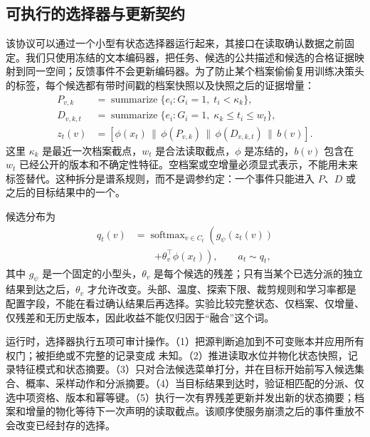 \documentclass[UTF8,twocolumn]{ctexart}
\newcommand{\unknown}{\textsc{未知}}
\begin{document}
\subsection{可执行的选择器与更新契约}
该协议可以通过一个小型有状态选择器运行起来，其接口在读取确认数据之前固定。我们只使用冻结的文本编码器，把任务、候选的公共描述和候选的合格证据映射到同一空间；反馈事件不会更新编码器。为了防止某个档案偷偷复用训练决策头的标签，每个候选都有带时间戳的档案快照以及快照之后的证据增量：
\begin{align}
 P_{v,k}&=\operatorname{summarize}\{e_i:G_i=1,\;t_i<\kappa_k\},\\
 D_{v,k,t}&=\operatorname{summarize}\{e_i:G_i=1,\;\kappa_k\leq t_i\leq w_t\},\\
 z_t(v)&=[\phi(x_t)\,\|\,\phi(P_{v,k})\,\|\,\phi(D_{v,k,t})\,\|\,b(v)] .
 \label{eq:selector-state}
\end{align}
这里 $\kappa_k$ 是最近一次档案截点，$w_t$ 是合法读取截点，$\phi$ 是冻结的，$b(v)$ 包含在 $w_t$ 已经公开的版本和不确定性特征。空档案或空增量必须显式表示，不能用未来标签替代。这种拆分是谱系规则，而不是调参约定：一个事件只能进入 $P$、$D$ 或之后的目标结果中的一个。

候选分布为
\begin{equation}
 \begin{aligned}
 q_t(v)&=\operatorname{softmax}_{v\in C_t}\left(g_\psi(z_t(v))\right.\\
       &\qquad\left.+\theta_v^\top\phi(x_t)\right),
       \qquad a_t\sim q_t,
 \end{aligned}
 \label{eq:selector}
\end{equation}
其中 $g_\psi$ 是一个固定的小型头，$\theta_v$ 是每个候选的残差；只有当某个已选分派的独立结果到达之后，$\theta_v$ 才允许改变。头部、温度、探索下限、裁剪规则和学习率都是配置字段，不能在看过确认结果后再选择。实验比较完整状态、仅档案、仅增量、仅残差和无历史版本，因此收益不能仅归因于“融合”这个词。

运行时，选择器执行五项可审计操作。（1）把源判断追加到不可变账本并应用所有权门；被拒绝或不完整的记录变成 \unknown{}。（2）推进读取水位并物化状态快照，记录特征模式和状态摘要。（3）只对合法候选菜单打分，并在目标开始前写入候选集合、概率、采样动作和分派摘要。（4）当目标结果到达时，验证相匹配的分派、仅选中项资格、版本和幂等键。（5）执行一次有界残差更新并发出新的状态摘要；档案和增量的物化等待下一次声明的读取截点。该顺序使服务崩溃之后的事件重放不会改变已经封存的选择。
\end{document}
